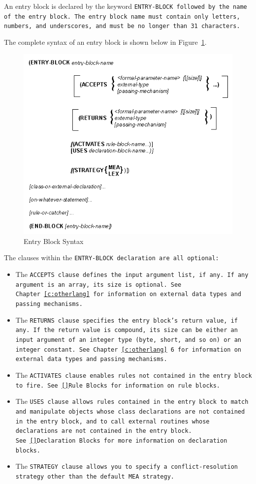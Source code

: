 An entry block is declared by the keyword \tt{ENTRY-BLOCK} followed by
the name of the entry block. The entry block name must contain only
letters, numbers, and underscores, and must be no longer than 31
characters.

The complete syntax of an entry block is shown below in Figure~\ref{f:5-1}.

\begin{figure}
  \centering
  \includegraphics[scale=0.7]{f5-1}
  \caption{Entry Block Syntax}
  \label{f:5-1}
\end{figure}

The clauses within the \tt{ENTRY-BLOCK} declaration are all optional:

\begin{itemize}
\item The \tt{ACCEPTS} clause defines the input argument list, if
  any. If any argument is an array, its size is optional. See
  Chapter~\ref{c:otherlang} for information on external data types and
  passing mechanisms.
\item The \tt{RETURNS} clause specifies the entry block's return
  value, if any. If the return value is compound, its size can be
  either an input argument of an integer type (byte, short, and so on)
  or an integer constant. See Chapter~\ref{c:otherlang} 6 for
  information on external data types and passing mechanisms.
\item The \tt{ACTIVATES} clause enables rules not contained in the
  entry block to fire. See~\ref{}Rule Blocks for information on rule blocks.
\item The \tt{USES} clause allows rules contained in the entry block
  to match and manipulate objects whose class declarations are not
  contained in the entry block, and to call external routines whose
  declarations are not contained in the entry block. See~\ref{}Declaration
  Blocks for more information on declaration blocks.
\item The \tt{STRATEGY} clause allows you to specify a
  conflict-resolution strategy other than the default \tt{MEA}
  strategy.
\end{itemize}
  
